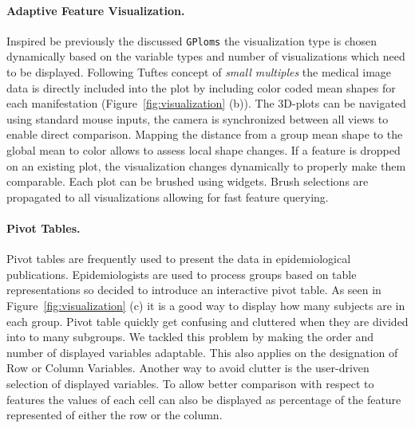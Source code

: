 \documentclass[journal]{style/vgtc} 			          %
\begin{document}
\paragraph{Adaptive Feature Visualization.} \label{sec:AdaptiveFeatureVisualization}
Inspired be previously the discussed \texttt{GPloms} \cite{Francois2013} the visualization type is chosen dynamically based on the variable types and number of visualizations which need to be displayed.
%
Following Tuftes concept of \emph{small multiples} \cite{Tufte1983} the medical image data is directly included into the plot by including color coded mean shapes for each manifestation (Figure~\ref{fig:visualization} (b)).
%
The 3D-plots can be navigated using standard mouse inputs, the camera is synchronized between all views to enable direct comparison.
%
Mapping the distance from a group mean shape to the global mean to color allows to assess local shape changes.
If a feature is dropped on an existing plot, the visualization changes dynamically to properly make them comparable. 
%
Each plot can be brushed using widgets.
%
Brush selections are propagated to all visualizations allowing for fast feature querying.
%
%

\paragraph{Pivot Tables.}
Pivot tables are frequently used to present the data in epidemiological publications.
%
Epidemiologists are used to process groups based on table representations so decided to introduce an interactive pivot table.
%
As seen in Figure~\ref{fig:visualization} (c) it is a good way to display how many subjects are in each group.
%
Pivot table quickly get confusing and cluttered when they are divided into to many subgroups.
%
We tackled this problem by making the order and number of displayed variables adaptable.
%
This also applies on the designation of Row or Column Variables.
%
Another way to avoid clutter is the user-driven selection of displayed variables.
%
To allow better comparison with respect to features the values of each cell can also be displayed as percentage of the feature represented of either the row or the column.
\end{document}
